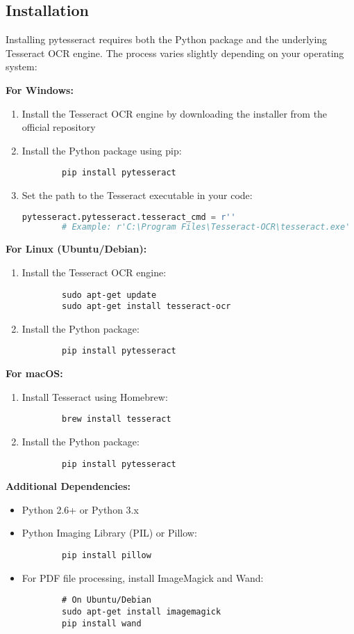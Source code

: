 \subsection{Installation}
Installing pytesseract requires both the Python package and the underlying Tesseract OCR engine. The process varies slightly depending on your operating system:

\textbf{For Windows:}
\begin{enumerate}
	\item Install the Tesseract OCR engine by downloading the installer from the official repository
	\item Install the Python package using pip:
	\begin{lstlisting}
		pip install pytesseract
	\end{lstlisting}
	\item Set the path to the Tesseract executable in your code:
	\begin{lstlisting}[language=Python]
		pytesseract.pytesseract.tesseract_cmd = r''
		# Example: r'C:\Program Files\Tesseract-OCR\tesseract.exe'
	\end{lstlisting}
\end{enumerate}

\textbf{For Linux (Ubuntu/Debian):}
\begin{enumerate}
	\item Install the Tesseract OCR engine:
	\begin{lstlisting}
		sudo apt-get update
		sudo apt-get install tesseract-ocr
	\end{lstlisting}
	\item Install the Python package:
	\begin{lstlisting}
		pip install pytesseract
	\end{lstlisting}
\end{enumerate}

\textbf{For macOS:}
\begin{enumerate}
	\item Install Tesseract using Homebrew:
	\begin{lstlisting}
		brew install tesseract
	\end{lstlisting}
	\item Install the Python package:
	\begin{lstlisting}
		pip install pytesseract
	\end{lstlisting}
\end{enumerate}

\textbf{Additional Dependencies:}
\begin{itemize}
	\item Python 2.6+ or Python 3.x
	\item Python Imaging Library (PIL) or Pillow:
	\begin{lstlisting}
		pip install pillow
	\end{lstlisting}
	\item For PDF file processing, install ImageMagick and Wand:
	\begin{lstlisting}
		# On Ubuntu/Debian
		sudo apt-get install imagemagick
		pip install wand
	\end{lstlisting}
\end{itemize}

